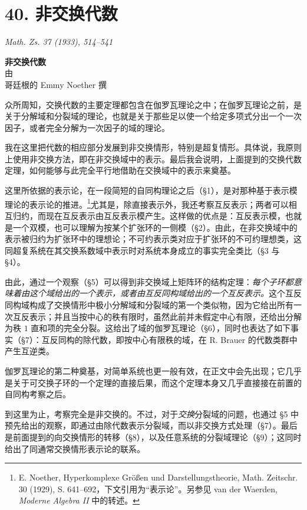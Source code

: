 \section*{40. 非交换代数}

\begin{center}
\emph{Math. Zs. 37 (1933), 514--541}
\end{center}

\begin{center}
\textbf{非交换代数}\\[0.5em]
由\\[0.25em]
哥廷根的 Emmy Noether 撰
\end{center}

众所周知，交换代数的主要定理都包含在伽罗瓦理论之中；在伽罗瓦理论之前，是关于分解域和分裂域的理论，也就是关于那些足以使一个给定多项式分出一个一次因子，或者完全分解为一次因子的域的理论。

我在这里把代数的相应部分发展到非交换情形，特别是超复情形。具体说，我原则上使用非交换方法，即在非交换域中的表示。最后我会说明，上面提到的交换代数定理，如何能够与此完全平行地借助在交换域中的表示来奠基。

这里所依据的表示论，在一段简短的自同构理论之后（§1），是对那种基于表示模理论的表示论的推进。\footnote{E. Noether, Hyperkomplexe Größen und Darstellungstheorie, Math. Zeitschr. 30 (1929), S. 641--692，下文引用为“表示论”。另参见 van der Waerden, \emph{Moderne Algebra II} 中的转述。}尤其是，除直接表示外，我还考察互反表示；两者可以相互归约，而现在互反表示由互反表示模产生。这样做的优点是：互反表示模，也就是一个双模，也可以理解为按某个扩张环的一侧模（§2）。由此，在非交换域中的表示被归约为扩张环中的理想论；不可约表示类对应于扩张环的不可约理想类，这同超复系统在其交换系数域中表示时对系统本身成立的事实完全类比（§3 与 §4）。

由此，通过一个观察（§5）可以得到非交换域上矩阵环的结构定理：\emph{每个子环都意味着由这个域给出的一个表示，或者由互反同构域给出的一个互反表示。}这个互反同构域构成了交换情形中极小分解域和分裂域的第一个类似物，因为它给出所有一次互反表示；并且当按中心的秩有限时，虽然此前并未假定中心有限，还给出分解为秩 \(1\) 直和项的完全分裂。这给出了域的伽罗瓦理论（§6），同时也表达了如下事实（§7）：互反同构的除代数，即按中心有限秩的域，在 R. Brauer 的代数类群中产生互逆类。

伽罗瓦理论的第二种奠基，对简单系统也更一般有效，在正文中会先出现；它几乎是关于可交换子环的一个定理的直接后果，而这个定理本身又几乎直接接在前置的自同构考察之后。

到这里为止，考察完全是非交换的。不过，对于\emph{交换}分裂域的问题，也通过 §5 中预先给出的观察，即通过由除代数表示分裂域，而以非交换方式处理（§7）。最后是前面提到的向交换情形的转移（§8），以及任意系统的分裂域理论（§9）；这同时给出了同通常交换情形表示论的联系。

